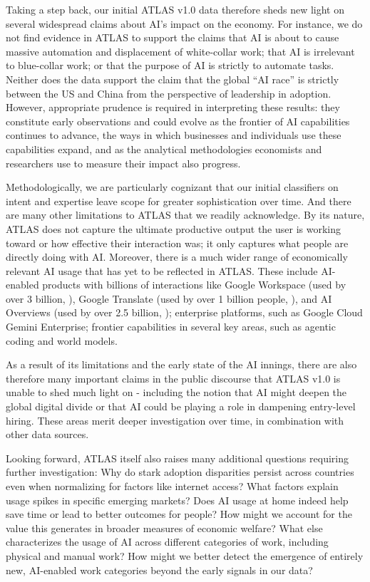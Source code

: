\documentclass[11pt,a4paper]{article}
\begin{document}
Taking a step back, our initial ATLAS v1.0 data therefore sheds new light on several widespread claims about AI’s impact on the economy.  For instance, we do not find evidence in ATLAS to support the claims that AI is about to cause massive automation and displacement of white-collar work; that AI is irrelevant to blue-collar work; or that the purpose of AI is strictly to automate tasks.  Neither does the data support the claim that the global ``AI race” is strictly between the US and China from the perspective of leadership in adoption. However, appropriate prudence is required in interpreting these results: they constitute early observations and could evolve as the frontier of AI capabilities continues to advance, the ways in which businesses and individuals use these capabilities expand, and as the analytical methodologies economists and researchers use to measure their impact also progress. 

Methodologically, we are particularly cognizant that our initial classifiers on intent and expertise leave scope for greater sophistication over time. And there are many other limitations to ATLAS that we readily acknowledge. By its nature, ATLAS does not capture the ultimate productive output the user is working toward or how effective their interaction was; it only captures what people are directly doing with AI. Moreover, there is a much wider range of economically relevant AI usage that has yet to be reflected in ATLAS. These include AI-enabled products with billions of interactions like Google Workspace (used by over 3 billion, \citep{GoogleWorkspace2025}), Google Translate (used by over 1 billion people, \cite{Yao2026Translate}), and AI Overviews (used by over 2.5 billion, \cite{Loew2026Search}); enterprise platforms, such as Google Cloud Gemini Enterprise; frontier capabilities in several key areas, such as agentic coding and world models.

As a result of its limitations and the early state of the AI innings, there are also therefore many important claims in the public discourse that ATLAS v1.0 is unable to shed much light on - including the notion that AI might deepen the global digital divide or that AI could be playing a role in dampening entry-level hiring.  These areas merit deeper investigation over time, in combination with other data sources. 


Looking forward, ATLAS itself also raises many additional questions requiring further investigation: Why do stark adoption disparities persist across countries even when normalizing for factors like internet access?  What factors explain usage spikes in specific emerging markets?  Does AI usage at home indeed help save time or lead to better outcomes for people?  How might we account for the value this generates in broader measures of economic welfare?  What else characterizes the usage of AI across different categories of work, including physical and manual work?  How might we better detect the emergence of entirely new, AI-enabled work categories beyond the early signals in our data?  
\end{document}
